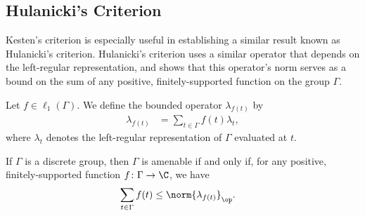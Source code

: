 \subsection{Hulanicki's Criterion}%
Kesten's criterion is especially useful in establishing a similar result known as Hulanicki's criterion. Hulanicki's criterion uses a similar operator that depends on the left-regular representation, and shows that this operator's norm serves as a bound on the sum of any positive, finitely-supported function on the group $\Gamma$.
\begin{definition}
  Let $f\in \ell_1\left( \Gamma \right)$. We define the bounded operator $\lambda_{f(t)}$ by
  \begin{align*}
    \lambda_{f(t)} &= \sum_{t\in\Gamma}f(t)\lambda_t,
  \end{align*}
  where $\lambda_t$ denotes the left-regular representation of $\Gamma$ evaluated at $t$.
\end{definition}
\begin{theorem}
  If $\Gamma$ is a discrete group, then $\Gamma$ is amenable if and only if, for any positive, finitely-supported function $f\colon \Gamma\rightarrow \C$, we have
  \begin{align*}
    \sum_{t\in\Gamma}f(t) &\leq \norm{\lambda_{f(t)}}_{\op}.
  \end{align*}
\end{theorem}
